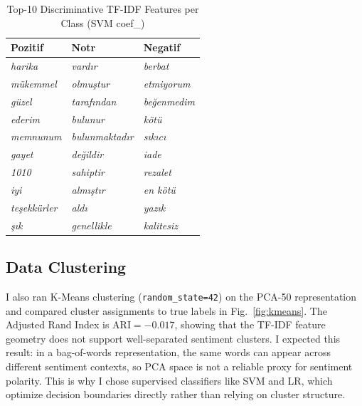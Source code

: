 \documentclass[conference]{IEEEtran}
\begin{document}
\begin{table}[htbp]
	\caption{Top-10 Discriminative TF-IDF Features per Class (SVM coef\_)}
	\label{tab:top_features}
	\begin{center}
		\footnotesize
		\renewcommand{\arraystretch}{1.2}
		\setlength{\tabcolsep}{5pt}
		\begin{tabular}{lll}
			\toprule
			\rowcolor{headerblue}
			\color{white}\textbf{Pozitif} & \color{white}\textbf{Notr} & \color{white}\textbf{Negatif} \\
			\midrule
			\textit{harika}      & \textit{vardır}          & \textit{berbat}     \\
			\textit{mükemmel}    & \textit{olmuştur}        & \textit{etmiyorum}  \\
			\textit{güzel}       & \textit{tarafından}      & \textit{beğenmedim} \\
			\textit{ederim}      & \textit{bulunur}         & \textit{kötü}       \\
			\textit{memnunum}    & \textit{bulunmaktadır}   & \textit{sıkıcı}     \\
			\textit{gayet}       & \textit{değildir}        & \textit{iade}       \\
			\textit{1010}        & \textit{sahiptir}        & \textit{rezalet}    \\
			\textit{iyi}         & \textit{almıştır}        & \textit{en kötü}    \\
			\textit{teşekkürler} & \textit{aldı}            & \textit{yazık}      \\
			\textit{şık}         & \textit{genellikle}      & \textit{kalitesiz}  \\
			\bottomrule
		\end{tabular}
	\end{center}
\end{table}

\subsection{Data Clustering}

I also ran K-Means clustering (\texttt{random\_state=42}) on the PCA-50
representation and compared cluster assignments to true labels in Fig.~\ref{fig:kmeans}.
The Adjusted Rand Index is $\text{ARI} = -0.017$, showing that the TF-IDF feature
geometry does not support well-separated sentiment clusters. I expected this result:
in a bag-of-words representation, the same words can appear across different sentiment
contexts, so PCA space is not a reliable proxy for sentiment polarity. This is why I
chose supervised classifiers like SVM and LR, which optimize decision boundaries
directly rather than relying on cluster structure.
\end{document}
